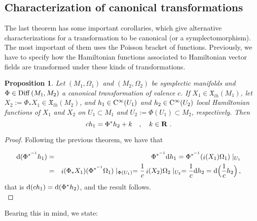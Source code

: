 \documentclass[12pt]{report}
\newtheorem{prop}[teor]{Proposition}
\def\qed{\ifvmode\removelastskip\fi
{\unskip\nobreak\hfil\penalty50\hbox{}\nobreak\hfil
\hbox{\vrule height1.2ex width1.2ex}\parfillskip=0pt
\finalhyphendemerits=0 \par\smallskip}}
\def\vf{\mathfrak X}
\def\d{{\rm d}}
\def\inn{\mathop{i}\nolimits}
\def\Cinfty{{\rm C}^\infty}
\begin{document}
\subsection{Characterization of canonical transformations}


The last theorem has some important corollaries, which give
alternative characterizations for a transformation to be canonical
(or a symplectomorphism).
The most important of them uses the Poisson bracket of functions.
Previously, we have to specify how the Hamiltonian functions associated to
Hamiltonian vector fields are transformed under 
these kinds of transformations.

\begin{prop}
Let $(M_1,\Omega_1)$ and $(M_2,\Omega_2)$ be
symplectic manifolds  
and $\Phi \in {\rm Diff}\,  (M_1,M_2)$
a canonical transformation of valence $c$.
If $X_1 \in \vf_{lh}(M_1)$, let $X_2 := \Phi_*X_1 \in \vf_{lh}(M_2)$,
and $h_1 \in \Cinfty (U_1)$ and $h_2 \in \Cinfty (U_2)$
local Hamiltonian functions of $X_1$ and $X_2$
on $U_1 \subset M_1$ and $U_2 :=\Phi (U_1) \subset M_2$,
respectively. Then
$$
ch_1 = \Phi^*h_2 + k \quad , \quad k \in {\bf R} \ .
$$
\end{prop}
\begin{proof}
Following the previous theorem, we have that

\begin{eqnarray*}
\d(\Phi^{*^{-1}}h_{1})&=&\Phi^{*^{-1}}\d h_{1} =\Phi^{*^{-1}}(\inn (X_1)\Omega_1)\mid_{U_1} \\&=&
\inn (\Phi_*X_1)(\Phi^{*^{-1}}\Omega_1)\mid_{\Phi (U_1)} =
\frac{1}{c}\inn (X_2)\Omega_2\mid_{U_2} =
\frac{1}{c}\d h_2 =\d\Big( \frac{1}{c}h_2\Big)  \,  ,
\end{eqnarray*}
that is
$\d(ch_{1})=\d(\Phi^{*} h_2)$, and the result follows.
\\ \qed  \end{proof}


Bearing this in mind, we state:
\end{document}
